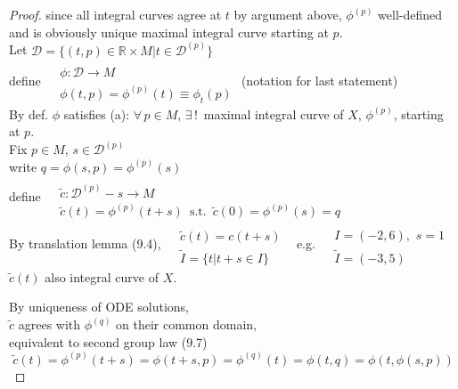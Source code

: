 \begin{proof}
since all integral curves agree at $t$ by argument above, $\phi^{(p)}$ well-defined \\
\quad \quad and is obviously unique maximal integral curve starting at $p$.   \\


Let $\mathcal{D} = \lbrace (t,p) \in \mathbb{R} \times M | t \in \mathcal{D}^{(p)} \rbrace$ \\
define $\begin{aligned} & \quad \\ 
  & \phi :\mathcal{D} \to M \\
  & \phi{(t,p)} = \phi^{(p)}{(t)} \equiv \phi_t{(p)} \end{aligned}$ (notation for last statement)  \\

By def. $\phi$ satisfies (a): $\forall \, p \in M$, $\exists \, ! \, $ maximal integral curve of $X$, $\phi^{(p)}$, starting at $p$.  \\

Fix $p\in M$, $s \in \mathcal{D}^{(p)}$ \\
write $q = \phi{ (s,p) } = \phi^{(p)}(s)$ \\

define $\begin{aligned} & \quad \\ 
  & \widetilde{c}: \mathcal{D}^{(p)} -s \to M \\
  & \widetilde{c}(t) = \phi^{(p)}(t+s) \, \text{ s.t. } \, \widetilde{c}{(0)} = \phi^{(p)}(s) = q \end{aligned}$ \\

By translation lemma (9.4), $\begin{aligned} & \quad \\
  & \widetilde{c}{(t)} = c{(t+s)} \\
  & \widetilde{I} = \lbrace t | t+s \in I \rbrace \end{aligned}$ \quad \, e.g. $\begin{aligned} & \quad \\ 
  & I = (-2,6) , \, \, s = 1 \\
  & \widetilde{I} = (-3,5) \end{aligned}$ \quad \, $\widetilde{c}(t)$ also integral curve of $X$.  

By uniqueness of ODE solutions, \\
\quad $\widetilde{c}$ agrees with $\phi^{(q)}$ on their common domain, \\
\quad \quad equivalent to second group law (9.7) 
\[
\widetilde{c}{(t)} = \phi^{(p)}{ (t+s)} = \phi{(t+s,p)} = \phi^{(q)}{(t)} = \phi{(t,q)} = \phi{(t,\phi{(s,p) }) }
\]



\end{proof}


